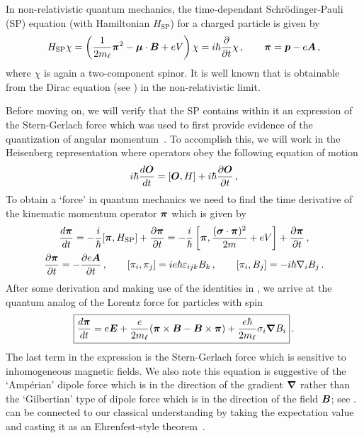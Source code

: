 In non-relativistic quantum mechanics, the time-dependant Schr{\"o}dinger-Pauli (SP) equation (with Hamiltonian $H_\mathrm{SP}$) for a charged particle is given by
\begin{gather}
	\label{sp:1}
    {H}_{\mathrm{SP}}\chi=\left(\frac{1}{2m_{\ell}}\boldsymbol{\pi}^{2}-\boldsymbol{\mu}\cdot\boldsymbol{B}+e{ V}\right)\chi=i\hbar\frac{\partial}{\partial t}\chi\,,\qquad
    \boldsymbol{\pi}=\boldsymbol{ p}-e{\boldsymbol{A}}\,,
\end{gather}
where $\chi$ is again a two-component spinor. It is well known that  is obtainable from the Dirac equation (see ) in the non-relativistic limit.

Before moving on, we will verify that the SP  contains within it an expression of the Stern-Gerlach force which was used to first provide evidence of the quantization of angular momentum~\citep{Gerlach:1922zz}. To accomplish this, we will work in the Heisenberg representation where operators obey the following equation of motion
\begin{align}
    \label{h:1}
    i\hbar\frac{d\boldsymbol{O}}{dt}=[\boldsymbol{O},H]+
    i\hbar\frac{\partial\boldsymbol{O}}{\partial t}\,,
\end{align}
To obtain a `force' in quantum mechanics we need to find the time derivative of the kinematic momentum operator $\boldsymbol{\pi}$ which is given by
\begin{gather}
    \label{h:2}
    \frac{d\boldsymbol{\pi}}{dt}=-\frac{i}{\hbar}[\boldsymbol{\pi},H_\mathrm{SP}]+\frac{\partial\boldsymbol{\pi}}{\partial t}=-\frac{i}{\hbar}\left[\boldsymbol{\pi},\frac{(\boldsymbol{\sigma}\cdot\boldsymbol{\pi})^{2}}{2m}+eV\right]+\frac{\partial\boldsymbol{\pi}}{\partial t}\,,\\
    \label{h:3}
    \frac{\partial\boldsymbol{\pi}}{\partial t} = -\frac{\partial e\boldsymbol{A}}{\partial t}\,,\qquad
    [\pi_{i},\pi_{j}]=ie\hbar\varepsilon_{ijk}B_{k}\,,\qquad
    [\pi_{i},B_{j}]=-i\hbar\nabla_{i}B_{j}\,.
\end{gather}
After some derivation and making use of the identities in , we arrive at the quantum analog of the Lorentz force for particles with spin
\begin{gather}
    \label{ehren:1}
    \boxed{\frac{d\boldsymbol{\pi}}{dt}=e\boldsymbol{E}+\frac{e}{2m_{\ell}}(\boldsymbol{\pi}\times\boldsymbol{B}-\boldsymbol{B}\times\boldsymbol{\pi})+\frac{e\hbar}{2m_{\ell}}\sigma_{i}\boldsymbol{\nabla}B_{i}}\,.
\end{gather}
The last term in the expression is the Stern-Gerlach force which is sensitive to inhomogeneous magnetic fields. We also note this equation is suggestive of the `Amp{\'e}rian' dipole force which is in the direction of the gradient $\boldsymbol{\nabla}$ rather than the `Gilbertian' type of dipole force which is in the direction of the field $\boldsymbol{B}$; see .  can be connected to our classical understanding by taking the expectation value and casting it as an Ehrenfest-style theorem~\citep{Ehrenfest:1927swx}.

